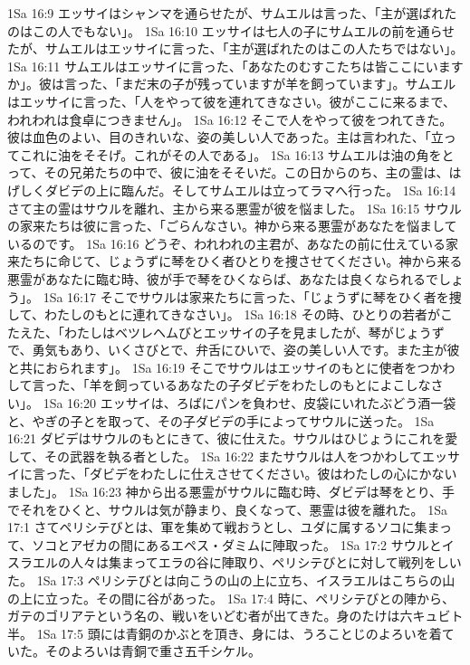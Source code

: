 1Sa 16:9  エッサイはシャンマを通らせたが、サムエルは言った、「主が選ばれたのはこの人でもない」。
1Sa 16:10  エッサイは七人の子にサムエルの前を通らせたが、サムエルはエッサイに言った、「主が選ばれたのはこの人たちではない」。
1Sa 16:11  サムエルはエッサイに言った、「あなたのむすこたちは皆ここにいますか」。彼は言った、「まだ末の子が残っていますが羊を飼っています」。サムエルはエッサイに言った、「人をやって彼を連れてきなさい。彼がここに来るまで、われわれは食卓につきません」。
1Sa 16:12  そこで人をやって彼をつれてきた。彼は血色のよい、目のきれいな、姿の美しい人であった。主は言われた、「立ってこれに油をそそげ。これがその人である」。
1Sa 16:13  サムエルは油の角をとって、その兄弟たちの中で、彼に油をそそいだ。この日からのち、主の霊は、はげしくダビデの上に臨んだ。そしてサムエルは立ってラマへ行った。
1Sa 16:14  さて主の霊はサウルを離れ、主から来る悪霊が彼を悩ました。
1Sa 16:15  サウルの家来たちは彼に言った、「ごらんなさい。神から来る悪霊があなたを悩ましているのです。
1Sa 16:16  どうぞ、われわれの主君が、あなたの前に仕えている家来たちに命じて、じょうずに琴をひく者ひとりを捜させてください。神から来る悪霊があなたに臨む時、彼が手で琴をひくならば、あなたは良くなられるでしょう」。
1Sa 16:17  そこでサウルは家来たちに言った、「じょうずに琴をひく者を捜して、わたしのもとに連れてきなさい」。
1Sa 16:18  その時、ひとりの若者がこたえた、「わたしはベツレヘムびとエッサイの子を見ましたが、琴がじょうずで、勇気もあり、いくさびとで、弁舌にひいで、姿の美しい人です。また主が彼と共におられます」。
1Sa 16:19  そこでサウルはエッサイのもとに使者をつかわして言った、「羊を飼っているあなたの子ダビデをわたしのもとによこしなさい」。
1Sa 16:20  エッサイは、ろばにパンを負わせ、皮袋にいれたぶどう酒一袋と、やぎの子とを取って、その子ダビデの手によってサウルに送った。
1Sa 16:21  ダビデはサウルのもとにきて、彼に仕えた。サウルはひじょうにこれを愛して、その武器を執る者とした。
1Sa 16:22  またサウルは人をつかわしてエッサイに言った、「ダビデをわたしに仕えさせてください。彼はわたしの心にかないました」。
1Sa 16:23  神から出る悪霊がサウルに臨む時、ダビデは琴をとり、手でそれをひくと、サウルは気が静まり、良くなって、悪霊は彼を離れた。
1Sa 17:1  さてペリシテびとは、軍を集めて戦おうとし、ユダに属するソコに集まって、ソコとアゼカの間にあるエペス・ダミムに陣取った。
1Sa 17:2  サウルとイスラエルの人々は集まってエラの谷に陣取り、ペリシテびとに対して戦列をしいた。
1Sa 17:3  ペリシテびとは向こうの山の上に立ち、イスラエルはこちらの山の上に立った。その間に谷があった。
1Sa 17:4  時に、ペリシテびとの陣から、ガテのゴリアテという名の、戦いをいどむ者が出てきた。身のたけは六キュビト半。
1Sa 17:5  頭には青銅のかぶとを頂き、身には、うろことじのよろいを着ていた。そのよろいは青銅で重さ五千シケル。
